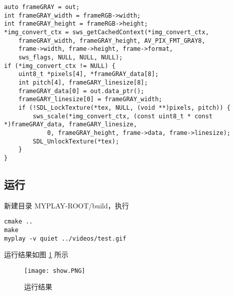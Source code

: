\begin{lstlisting}
auto frameGRAY = out;
int frameGRAY_width = frameRGB->width;
int frameGRAY_height = frameRGB->height;
*img_convert_ctx = sws_getCachedContext(*img_convert_ctx,
    frameGRAY_width, frameGRAY_height, AV_PIX_FMT_GRAY8, 
    frame->width, frame->height, frame->format, 
    sws_flags, NULL, NULL, NULL);
if (*img_convert_ctx != NULL) {
    uint8_t *pixels[4], *frameGRAY_data[8];
    int pitch[4], frameGARY_linesize[8];
    frameGRAY_data[0] = out.data_ptr();
    frameGARY_linesize[0] = frameGRAY_width;
    if (!SDL_LockTexture(*tex, NULL, (void **)pixels, pitch)) {
        sws_scale(*img_convert_ctx, (const uint8_t * const *)frameGRAY_data, frameGARY_linesize,
            0, frameGRAY_height, frame->data, frame->linesize);
        SDL_UnlockTexture(*tex);
    }
}
\end{lstlisting}

\subsection{运行}

新建目录 MYPLAY-ROOT/build，执行

\begin{lstlisting}
cmake ..
make
myplay -v quiet ../videos/test.gif
\end{lstlisting}

运行结果如图 \ref{fig:show} 所示

\begin{figure}[h]
\centering
\texttt{[image: show.PNG]}
\caption{运行结果}
\label{fig:show}
\end{figure}